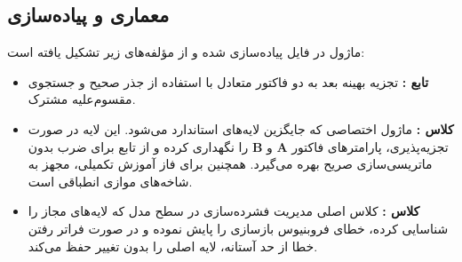 \subsection{معماری و پیاده‌سازی}
ماژول در فایل  پیاده‌سازی شده و از مؤلفه‌های زیر تشکیل یافته است:
\begin{itemize}
    \item \textbf{تابع :} تجزیه بهینه بعد به دو فاکتور متعادل با استفاده از جذر صحیح و جستجوی مقسوم‌علیه مشترک.
    \item \textbf{کلاس :} ماژول اختصاصی  که جایگزین لایه‌های استاندارد می‌شود. این لایه در صورت تجزیه‌پذیری، پارامترهای فاکتور $\mathbf{A}$ و $\mathbf{B}$ را نگهداری کرده و از تابع  برای ضرب بدون ماتریسی‌سازی صریح بهره می‌گیرد. همچنین برای فاز آموزش تکمیلی، مجهز به شاخه‌های موازی انطباقی  است.
    \item \textbf{کلاس :} کلاس اصلی مدیریت فشرده‌سازی در سطح مدل که لایه‌های مجاز را شناسایی کرده، خطای فروبنیوس بازسازی را پایش نموده و در صورت فراتر رفتن خطا از حد آستانه، لایه اصلی را بدون تغییر حفظ می‌کند.
\end{itemize}
